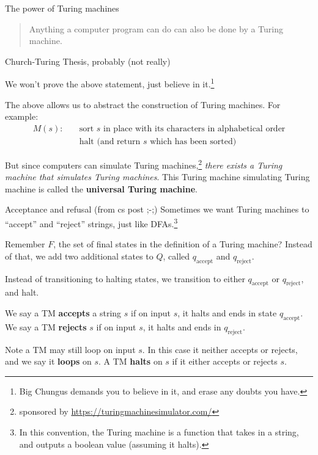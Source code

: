 \documentclass{beamer}
\begin{document}
\begin{frame}{The power of Turing machines}
\begin{quote}
Anything a computer program can do can also be done by a Turing machine.
\end{quote}
\begin{flushright}
Church-Turing Thesis, probably (not really)
\end{flushright}

\vspace{2mm}

We won't prove the above statement, just believe in it.\footnote{Big Chungus demands you to believe in it, and erase any doubts you have.} 

\vspace{2mm}

The above allows us to abstract the construction of Turing machines. For example:
\begin{align*}
M(s): & \quad \text{sort $s$ in place with its characters in alphabetical order}\\
& \quad \text{halt (and return $s$ which has been sorted)}
\end{align*}

But since computers can simulate Turing machines,\footnote{sponsored by \url{https://turingmachinesimulator.com/}} \textit{there exists a Turing machine that simulates Turing machines}. This Turing machine simulating Turing machine is called the \textbf{universal Turing machine}.
\end{frame}

\begin{frame}{Acceptance and refusal (from cs post ;-;)}
Sometimes we want Turing machines to ``accept'' and ``reject'' strings, just like DFAs.\footnote{In this convention, the Turing machine is a function that takes in a string, and outputs a boolean value (assuming it halts).}

Remember $F$, the set of final states in the definition of a Turing machine? Instead of that, we add two additional states to $Q$, called $q_\text{accept}$ and $q_\text{reject}$. 

Instead of transitioning to halting states, we transition to either $q_\text{accept}$ or $q_\text{reject}$, and halt. 

We say a TM \textbf{accepts} a string $s$ if on input $s$, it halts and ends in state $q_\text{accept}$. We say a TM \textbf{rejects} $s$ if on input $s$, it halts and ends in $q_\text{reject}$. 

\vspace{2mm}

Note a TM may still loop on input $s$. In this case it neither accepts or rejects, and we say it \textbf{loops} on $s$. A TM \textbf{halts} on $s$ if it either accepts or rejects $s$.
\end{frame}
\end{document}
